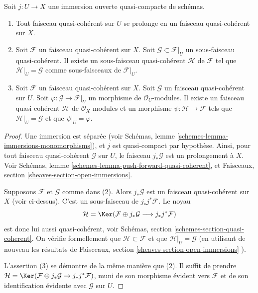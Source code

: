 \begin{lemma}
\label{lemma-extend-trivial}
Soit $j : U \to X$ une immersion ouverte quasi-compacte de schémas.
\begin{enumerate}
\item Tout faisceau quasi-cohérent sur $U$ se prolonge en un faisceau
quasi-cohérent sur $X$.
\item Soit $\mathcal{F}$ un faisceau quasi-cohérent sur $X$.
Soit $\mathcal{G} \subset \mathcal{F}|_U$ un sous-faisceau
quasi-cohérent. Il existe un sous-faisceau quasi-cohérent $\mathcal{H}$ de
$\mathcal{F}$ tel que $\mathcal{H}|_U = \mathcal{G}$
comme sous-faisceaux de $\mathcal{F}|_U$.
\item Soit $\mathcal{F}$ un faisceau quasi-cohérent sur $X$.
Soit $\mathcal{G}$ un faisceau quasi-cohérent sur $U$.
Soit $\varphi : \mathcal{G} \to \mathcal{F}|_U$ un morphisme
de $\mathcal{O}_U$-modules. Il existe un faisceau quasi-cohérent $\mathcal{H}$
de $\mathcal{O}_X$-modules et un morphisme $\psi : \mathcal{H} \to \mathcal{F}$
tels que $\mathcal{H}|_U = \mathcal{G}$ et que
$\psi|_U = \varphi$.
\end{enumerate}
\end{lemma}

\begin{proof}
Une immersion est séparée
(voir Schémas, lemme \ref{schemes-lemma-immersions-monomorphisms}),
et $j$ est quasi-compact par hypothèse.
Ainsi, pour tout faisceau quasi-cohérent $\mathcal{G}$ sur $U$, le faisceau
$j_*\mathcal{G}$ est un prolongement à $X$. Voir
Schémas, lemme \ref{schemes-lemma-push-forward-quasi-coherent}, et
Faisceaux, section \ref{sheaves-section-open-immersions}.

\medskip\noindent
Supposons $\mathcal{F}$ et $\mathcal{G}$ comme dans (2).
Alors $j_*\mathcal{G}$ est un faisceau quasi-cohérent sur $X$ (voir ci-dessus).
C'est un sous-faisceau de $j_*j^*\mathcal{F}$.
Le noyau
$$
\mathcal{H} =
\Ker(\mathcal{F} \oplus j_* \mathcal{G}
\longrightarrow j_*j^*\mathcal{F})
$$
est donc lui aussi quasi-cohérent,
voir Schémas, section \ref{schemes-section-quasi-coherent}.
On vérifie formellement que $\mathcal{H} \subset \mathcal{F}$ et que
$\mathcal{H}|_U = \mathcal{G}$ (en utilisant de nouveau les
résultats de Faisceaux, section \ref{sheaves-section-open-immersions} ).

\medskip\noindent
L'assertion (3) se démontre de la même manière que (2). Il suffit de prendre
$\mathcal{H} = \Ker(\mathcal{F} \oplus j_* \mathcal{G}
\to j_*j^*\mathcal{F})$, muni de son morphisme évident vers $\mathcal{F}$
et de son identification évidente avec $\mathcal{G}$ sur $U$.
\end{proof}

